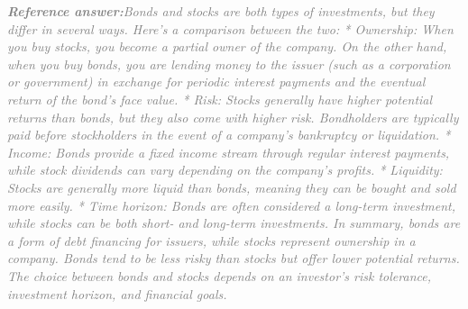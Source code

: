 \documentclass[a4paper,11pt]{article}
\begin{document}
\begin{refanswerenv}
{\footnotesize\textit{\textcolor{gray}{\textbf{Reference answer:}\enspace Bonds and stocks are both types of investments, but they differ in several ways. Here's a comparison between the two:
* Ownership: When you buy stocks, you become a partial owner of the company. On the other hand, when you buy bonds, you are lending money to the issuer (such as a corporation or government) in exchange for periodic interest payments and the eventual return of the bond's face value.
* Risk: Stocks generally have higher potential returns than bonds, but they also come with higher risk. Bondholders are typically paid before stockholders in the event of a company's bankruptcy or liquidation.
* Income: Bonds provide a fixed income stream through regular interest payments, while stock dividends can vary depending on the company's profits.
* Liquidity: Stocks are generally more liquid than bonds, meaning they can be bought and sold more easily.
* Time horizon: Bonds are often considered a long-term investment, while stocks can be both short- and long-term investments.
In summary, bonds are a form of debt financing for issuers, while stocks represent ownership in a company. Bonds tend to be less risky than stocks but offer lower potential returns. The choice between bonds and stocks depends on an investor's risk tolerance, investment horizon, and financial goals.}}}
\end{refanswerenv}
\end{document}

